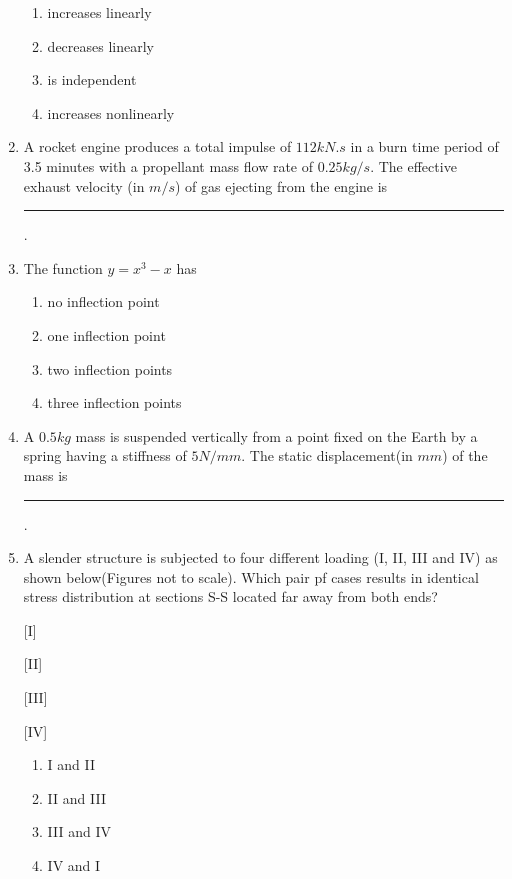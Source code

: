 \documentclass[journal,12pt,onecolumn]{IEEEtran}
\theoremstyle{remark}
\begin{document}
\begin{enumerate}
   \begin{enumerate}
  \item increases linearly
  \item decreases linearly 
  \item is independent
  \item increases nonlinearly
  \end{enumerate}
 \item A rocket engine produces a total impulse of $112 kN.s$ in a burn time period of 3.5 minutes with a propellant mass flow rate of $0.25 kg/s$. The effective exhaust velocity (in $m/s$) of gas ejecting from the engine is \rule{2.5cm}{0.4pt}.
\item The function $y=x^3-x$ has
\begin{enumerate}
\item no inflection point
\item one inflection point
\item two inflection points
\item three inflection points
\end{enumerate}
\item A $0.5 kg$ mass is suspended vertically from a point fixed on the Earth by a spring having a stiffness of $5 N/mm$. The static displacement(in $mm$) of the mass is \rule{2.5cm}{0.4pt}.

\item A slender structure is subjected to four different loading (I, II, III and IV) as shown below(Figures not to scale). Which pair pf cases results in identical stress distribution at sections S-S located far away from both ends?

[I]




[II]




[III]


 


[IV]


 

\begin{enumerate}
\item I and II
\item II and III
\item III and IV
\item IV and I
\end{enumerate}
\end{enumerate} 
\end{document}
